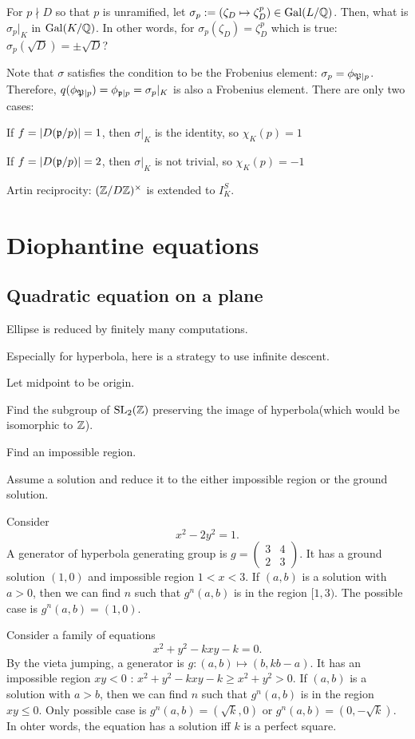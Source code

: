 \documentclass[11pt]{article}
\let\realsection\section
\renewcommand\section{\newpage\realsection}
\begin{document}
For $p\nmid D$ so that $p$ is unramified, let $\sigma_p:=(\zeta_D\mapsto\zeta_D^p)\in\operatorname{Gal}(L/\mathbb{Q})$.
Then, what is $\sigma_p|_K$ in $\operatorname{Gal}(K/\mathbb{Q})$.
In other words, for $\sigma_p(\zeta_D)=\zeta_D^p$ which is true: $\sigma_p(\sqrt D)=\pm\sqrt D$?

Note that $\sigma$ satisfies the condition to be the Frobenius element: $\sigma_p=\phi_{\mathfrak{P}|p}$.
Therefore, $q(\phi_{\mathfrak{P}|p})=\phi_{\mathfrak{p}|p}=\sigma_p|_K$ is also a Frobenius element.
There are only two cases:
\begin{cond}
\item If $f=|D(\mathfrak{p}/p)|=1$, then $\sigma|_K$ is the identity, so $\chi_K(p)=1$
\item If $f=|D(\mathfrak{p}/p)|=2$, then $\sigma|_K$ is not trivial, so $\chi_K(p)=-1$
\end{cond}

Artin reciprocity: $(\mathbb{Z}/D\mathbb{Z})^\times$ is extended to $I_K^S$.







\section{Diophantine equations}

\subsection{Quadratic equation on a plane}
Ellipse is reduced by finitely many computations.


Especially for hyperbola, here is a strategy to use infinite descent.
\begin{cond}
\item Let midpoint to be origin.
\item Find the subgroup of $\mathrm{SL}_2(\mathbb{Z})$ preserving the image of hyperbola(which would be isomorphic to $\mathbb{Z}$).
\item Find an impossible region.
\item Assume a solution and reduce it to the either impossible region or the ground solution.
\end{cond}
\begin{ex}
Consider\[x^2-2y^2=1.\]
A generator of hyperbola generating group is $g=\begin{pmatrix}3&4\\2&3\end{pmatrix}$.
It has a ground solution $(1,0)$ and impossible region $1<x<3$.
If $(a,b)$ is a solution with $a>0$, then we can find $n$ such that $g^n(a,b)$ is in the region $[1,3)$.
The possible case is $g^n(a,b)=(1,0)$.
\end{ex}
\begin{ex}
Consider a family of equations\[x^2+y^2-kxy-k=0.\]
By the vieta jumping, a generator is $g:(a,b)\mapsto(b,kb-a)$.
It has an impossible region $xy<0$ : $x^2+y^2-kxy-k\ge x^2+y^2>0$.
If $(a,b)$ is a solution with $a>b$, then we can find $n$ such that $g^n(a,b)$ is in the region $xy\le0$.
Only possible case is $g^n(a,b)=(\sqrt k,0)$ or $g^n(a,b)=(0,-\sqrt k)$.
In ohter words, the equation has a solution iff $k$ is a perfect square.
\end{ex}
\end{document}
